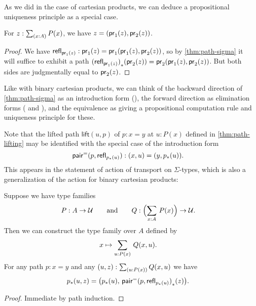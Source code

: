 As we did in the case of cartesian products, we can deduce a propositional uniqueness principle as a special case.

\begin{cor}\label{thm:eta-sigma}
  For $z:\sm{x:A} P(x)$, we have $z = (\mathsf{pr}_{1}(z),\mathsf{pr}_{2}(z))$.
\end{cor}
\begin{proof}
  We have $\mathsf{refl}_{\mathsf{pr}_{1}(z)} : \mathsf{pr}_{1}(z) = \mathsf{pr}_{1}(\mathsf{pr}_{1}(z),\mathsf{pr}_{2}(z))$, so by \autoref{thm:path-sigma} it will suffice to exhibit a path ${(\mathsf{refl}_{\mathsf{pr}_{1}(z)})}_{*}\mathopen{}\left({\mathsf{pr}_{2}(z)}\right)\mathclose{} = \mathsf{pr}_{2}(\mathsf{pr}_{1}(z),\mathsf{pr}_{2}(z))$.
  But both sides are judgmentally equal to $\mathsf{pr}_{2}(z)$.
\end{proof}

Like with binary cartesian products, we can think of 
the backward direction of \autoref{thm:path-sigma} as
an introduction form (\pairpath{}{}), the forward direction as
elimination forms ( and ), and the equivalence
as giving a propositional computation rule and uniqueness principle for these.

Note that the lifted path $\mathsf{lift}(u,p)$  of $p:x=y$ at $u:P(x)$ defined in \autoref{thm:path-lifting} may be identified with the special case of the introduction form
\[\mathsf{pair}^{\mathord{=}}(p,\mathsf{refl}_{{p}_{*}\mathopen{}\left({u}\right)\mathclose{}}):(x,u) = (y,{p}_{*}\mathopen{}\left({u}\right)\mathclose{}).\]
%
This appears in the statement of action of transport on $\Sigma$-types, which is also a generalization of the action for binary cartesian products:

\begin{thm}\label{transport-Sigma}
  Suppose we have type families
  \begin{equation*}
    P:A\to\type
    \qquad\text{and}\qquad
    Q:\Parens{\sm{x:A} P(x)}\to\type.
  \end{equation*}
  Then we can construct the type family over $A$ defined by
  \begin{equation*}
    x \mapsto \sm{u:P(x)} Q(x,u).
  \end{equation*}
  For any path $p:x=y$ and any $(u,z):\sm{u:P(x)} Q(x,u)$ we have
  \begin{equation*}
    {p}_{*}\mathopen{}\left({u,z}\right)\mathclose{}=\big({p}_{*}\mathopen{}\left({u}\right)\mathclose{},\,{\mathsf{pair}^{\mathord{=}}(p,\mathsf{refl}_{{p}_{*}\mathopen{}\left({u}\right)\mathclose{}})}_{*}\mathopen{}\left({z}\right)\mathclose{}\big).
  \end{equation*}
\end{thm}

\begin{proof}
Immediate by path induction.
\end{proof}

